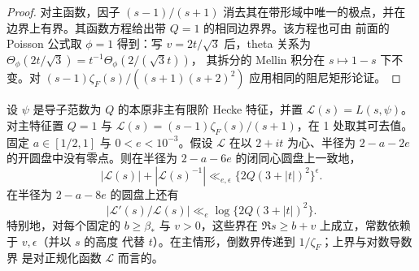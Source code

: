 \begin{proof}
对主函数，因子 $(s-1)/(s+1)$ 消去其在带形域中唯一的极点，并在
边界上有界。其函数方程给出带 $Q=1$ 的相同边界界。该方程也可由
前面的 Poisson 公式取 $\phi=1$ 得到：写 $v=2t/\sqrt3$ 后，theta
关系为 $\Theta_\phi(2t/\sqrt3)=t^{-1}\Theta_\phi(2/(\sqrt3t))$，
其拆分的 Mellin 积分在 $s\mapsto1-s$ 下不变。对
$(s-1)\zeta_F(s)/((s+1)(s+2)^2)$ 应用相同的阻尼矩形论证。
\end{proof}

\begin{lemma}[对数控制]\label{lem:logarithmic-control}
设 $\psi$ 是导子范数为 $Q$ 的本原非主有限阶 Hecke 特征，并置
$\mathcal L(s)=L(s,\psi)$。对主特征置 $Q=1$ 与
$\mathcal L(s)=(s-1)\zeta_F(s)/(s+1)$，在 1 处取其可去值。固定
$a\in[1/2,1]$ 与 $0<e<10^{-3}$。假设 $\mathcal L$ 在以 $2+it$
为心、半径为 $2-a-2e$ 的开圆盘中没有零点。则在半径为
$2-a-6e$ 的闭同心圆盘上一致地，
\begin{equation}\label{eq:disk-control}
 |\mathcal L(s)|+|\mathcal L(s)^{-1}|
 \ll_{e,\epsilon}\{2Q(3+|t|)^2\}^{\epsilon}.
\end{equation}
在半径为 $2-a-8e$ 的圆盘上还有
\[
 |\mathcal L'(s)/\mathcal L(s)|\ll_e\log\{2Q(3+|t|)^2\}.
\]
特别地，对每个固定的 $b\ge\beta_*$ 与 $v>0$，这些界在
$\Re s\ge b+v$ 上成立，常数依赖于 $v,\epsilon$（并以 $s$ 的高度
代替 $t$）。在主情形，倒数界传递到 $1/\zeta_F$；上界与对数导数界
是对正规化函数 $\mathcal L$ 而言的。
\end{lemma}

